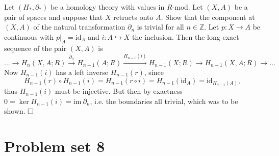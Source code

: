 \documentclass[11pt]{book}
\numberwithin{dummy}{section}
\theoremstyle{nonumberbreak}
\newenvironment{sol}[1][]{\ifthenelse{\equal{#1}{}}{\solution}{\solution[#1]}\rm}{\endsolution}
\newenvironment{prob}[1][]{\ifthenelse{\equal{#1}{}}{\problem}{\problem[#1]}\rm}{\endproblem}
\newcommand{\Rmod}{\underline{R\textrm{-}\mathrm{mod}}}
\newcommand{\la}{\longrightarrow}
\newcommand{\id}{\mathrm{id}}
\begin{document}
\begin{spacing}{1.4}
\begin{prob}
\begin{sol}
\end{sol}

\end{prob}


\begin{prob}
Let $(H_*, \partial_*)$ be a homology theory with values in $\Rmod$. Let $(X,A)$ be a pair of spaces and suppose that $X$ retracts onto $A$. Show that the component at $(X,A)$ of the natural transformation $\partial_n$ is trivial for all $n \in \mathbb{Z}$.
\begin{sol}
Let $p: X \la A$ be continuous with $p\vert_A = \id_A$ and $i: A \hookrightarrow X$ the inclusion. Then the long exact sequence of the pair $(X,A)$ is
$$\ldots \la H_{n}(X,A;R) \overset{\partial_{n}}{\la} H_{n-1}(A;R) \overset{H_{n-1}(i)}{\la} H_{n-1}(X;R) \la H_{n-1}(X,A;R) \la \ldots$$
Now $H_{n-1}(i)$ has a left inverse $H_{n-1}(r)$, since
$$H_{n-1}(r) \circ H_{n-1}(i) = H_{n-1}(r \circ i) = H_{n-1}(\id_A) = \id_{H_{n-1}(A)},$$
thus $H_{n-1}(i)$ must be injective. But then by exactness $0=\ker H_{n-1}(i) = \mathrm{im} \ \partial_n$, i.e. the boundaries all trivial, which was to be shown. $\hfill \Box$

\end{sol}
\end{prob}



























\newpage 



\titlespacing*{\section}{-16.5pt}{0pt}{20pt}
\renewcommand*\thesection{}
\section{Problem set 8} %
\renewcommand*\thesection{\arabic{section}}






\end{spacing}
\end{document}
